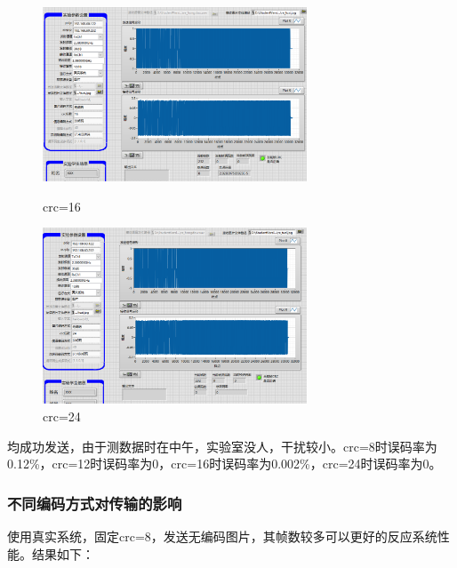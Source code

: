 \documentclass[UTF8]{ctexart}
\begin{document}
\begin{figure}[H]
    \centering
    \includegraphics[width=0.7\textwidth]{pics/crc16.png}
    \caption{crc=16}
    \includegraphics[width=0.7\textwidth]{pics/crc24.png}
    \caption{crc=24}
\end{figure}

均成功发送，由于测数据时在中午，实验室没人，干扰较小。crc=8时误码率为0.12\%，crc=12时误码率为0，crc=16时误码率为0.002\%，crc=24时误码率为0。

\newpage

\subsubsection{不同编码方式对传输的影响}

使用真实系统，固定crc=8，发送无编码图片，其帧数较多可以更好的反应系统性能。结果如下：
\end{document}

